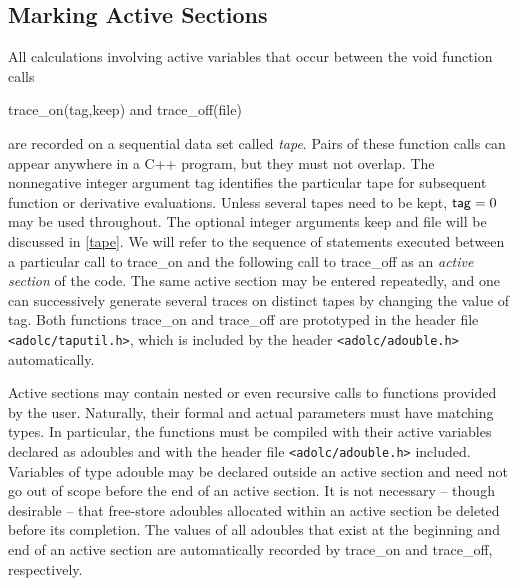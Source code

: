 \documentclass[11pt,twoside]{article}
\begin{document}
\subsection{Marking Active Sections}
\label{markingActive}
%
All calculations involving active variables that occur between
the void function calls
\begin{center}
{\sf trace\_on(tag,keep)} \hspace{0.3in} and \hspace{0.3in}
{\sf trace\_off(file)}
\end{center}
are recorded on a sequential data set called {\em tape}. Pairs of
these function calls can appear anywhere in a C++ program, but
they must not overlap. The nonnegative integer argument {\sf tag} identifies the
particular tape for subsequent function or derivative evaluations.
Unless several tapes need to be kept, ${\sf tag} =0$ may be used throughout.
The optional integer arguments {\sf keep} and
{\sf file} will be discussed in \autoref{tape}. We will refer to the
sequence of statements executed between a particular call to
{\sf trace\_on} and the following call to {\sf trace\_off} as an
{\em active section} of the code. The same active section may be
entered repeatedly, and one can successively generate several traces
on distinct tapes by changing the value of {\sf tag}. 
Both functions {\sf trace\_on} and {\sf trace\_off} are prototyped in
the header file \verb=<adolc/taputil.h>=, which is included by the header
\verb=<adolc/adouble.h>= automatically.

Active sections may contain nested or even recursive calls to functions
provided by the user. Naturally, their formal and actual parameters
must have matching types. In particular, the functions must be 
compiled with their active variables declared as
{\sf adouble}s and with the header file \verb=<adolc/adouble.h>= included.  
Variables of type {\sf adouble} may be declared outside an active section and need not
go out of scope before the end of an active section. 
It is not necessary -- though desirable -- that free-store {\sf adouble}s
allocated within
an active section be deleted before its completion. The values of all
{\sf adouble}s that exist at the beginning and end of an active section
are automatically 
recorded by {\sf trace\_on} and {\sf trace\_off}, respectively.
%
\end{document}
